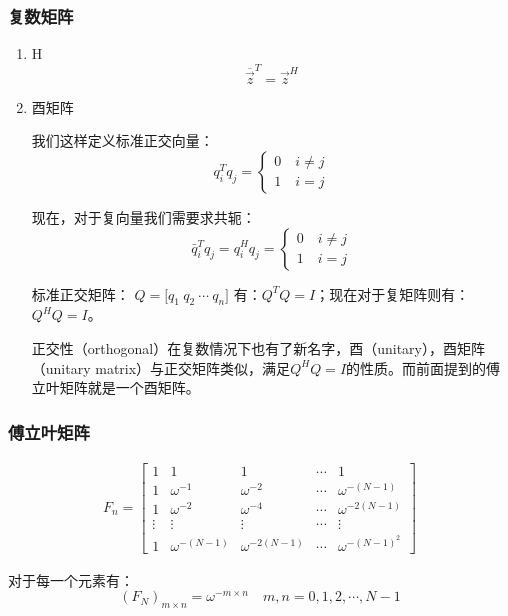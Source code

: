 \subsubsection{复数矩阵}
\begin{enumerate}
	\item H
	      \begin{equation}
		      \overline{\vec{z}}^T=\vec{z}^H
	      \end{equation}
	\item 酉矩阵

	      我们这样定义标准正交向量：
	      $$
		      q_i^Tq_j=\begin{cases}0\quad i\neq j\\1\quad i=j\end{cases}
	      $$

	      现在，对于复向量我们需要求共轭：
	      $$
		      \bar{q}_i^Tq_j=q_i^Hq_j=\begin{cases}0\quad i\neq j\\1\quad i=j\end{cases}
	      $$

	      标准正交矩阵：
	      $
		      Q=\Bigg[q_1\ q_2\ \cdots\ q_n\Bigg]
	      $
	      有：$Q^TQ=I$；现在对于复矩阵则有：$Q^HQ=I$。

	      正交性（orthogonal）在复数情况下也有了新名字，酉（unitary），酉矩阵（unitary matrix）与正交矩阵类似，满足$Q^HQ=I$的性质。而前面提到的傅立叶矩阵就是一个酉矩阵。
\end{enumerate}
\subsubsection{傅立叶矩阵}
\begin{align*}
	F_n=\begin{bmatrix} 1      & 1               & 1                & \cdots & 1                 \\
		1      & \omega^{-1}     & \omega^{-2}      & \cdots & \omega^{-(N-1)}   \\
		1      & \omega^{-2}     & \omega^{-4}      & \cdots & \omega^{-2(N-1)}  \\
		\vdots & \vdots          & \vdots           & \cdots & \vdots            \\
		1      & \omega^{-(N-1)} & \omega^{-2(N-1)} & \cdots & \omega^{-(N-1)^2}\end{bmatrix}
\end{align*}

对于每一个元素有：
$$
	(F_N)_{m\times n}=\omega ^{-m\times n}\quad m,n=0,1,2,\cdots,N-1
$$

